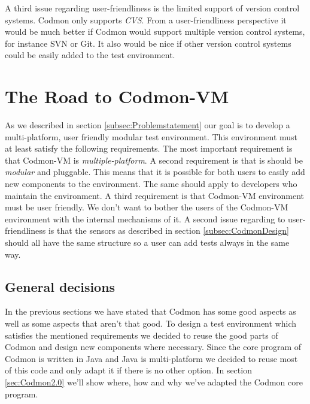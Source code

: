 \documentclass{article}
\newcommand{\project}{Codmon-VM}
\begin{document}
\noindent A third issue regarding user-friendliness is the limited support of version control systems. Codmon only supports \emph{CVS}\cite{CVS}. From a user-friendliness perspective it would be much better 
if Codmon would support multiple version control systems, for instance SVN\cite{SVN} or Git\cite{Git}. It also would be nice if other version control systems could be easily added to the test environment.


\section{The Road to \project{}}
\label{sec:road}
As we described in section \ref{subsec:Problemstatement} our goal is to develop a multi-platform, user friendly modular test environment. This environment must at least satisfy the following requirements. 
The most important requirement is that \project{} is \emph{multiple-platform}. A second requirement is that is should be \emph{modular} and pluggable. This means that it is possible for both users to easily 
add new components to the environment. The same should apply to developers who maintain the environment. A third requirement is that \project{} environment must be user friendly. We don't want to bother 
the users of the \project{} environment with the internal mechanisms of it. A second issue regarding to user-friendliness is that the sensors as described in section \ref{subsec:CodmonDesign} should all 
have the same structure so a user can add tests always in the same way.\\

\subsection{General decisions}
\label{subsec:general}
In the previous sections we have stated that Codmon has some good aspects as well as some aspects that aren't that good. To design a test environment which satisfies the mentioned requirements 
we decided to reuse the good parts of Codmon and design new components where necessary. Since the core program of Codmon is written in Java and Java is multi-platform we decided to reuse most of this code 
and only adapt it if there is no other option. In section \ref{sec:Codmon2.0} we'll show where, how and why we've adapted the Codmon core program. 
\end{document}

